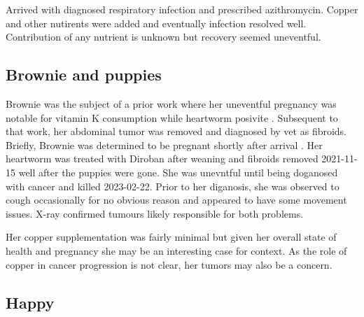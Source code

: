 \mjmmixiecu

Arrived with diagnosed respiratory infection and prescribed azithromycin.
Copper and other nutirents were added and eventually infection
resolved well. Contribution of any nutrient is unknown but recovery
seemed uneventful.

\subsection{Brownie and puppies}

\mjmbrowniecu

Brownie was the subject of a prior work 
where her uneventful pregnancy was notable
for vitamin K consumption while heartworm posivite
\cite{mmarchywka-MJM-2021-003-v0.50rg}. 
Subsequent to that work, her abdominal tumor
was removed and diagnosed  by vet as fibroids. 
Briefly, 
Brownie was determined to be pregnant shortly after arrival
. Her  heartworm
was  treated with Diroban after weaning  and fibroids
removed 2021-11-15 well after the puppies were gone. She was
unevntful until being doganosed with cancer and killed
2023-02-22. Prior to her diganosis, she was observed to 
cough occasionally for no obvious reason and appeared to
have some movement issues. X-ray confirmed tumours likely
responsible for both problems.   

Her copper supplementation was fairly minimal but given her
overall state of health and pregnancy she may be
an interesting case for context.  As the role of copper in cancer
progression is not clear, her tumors  may also be a concern. 


\subsection{Happy}

\mjmhappycu

